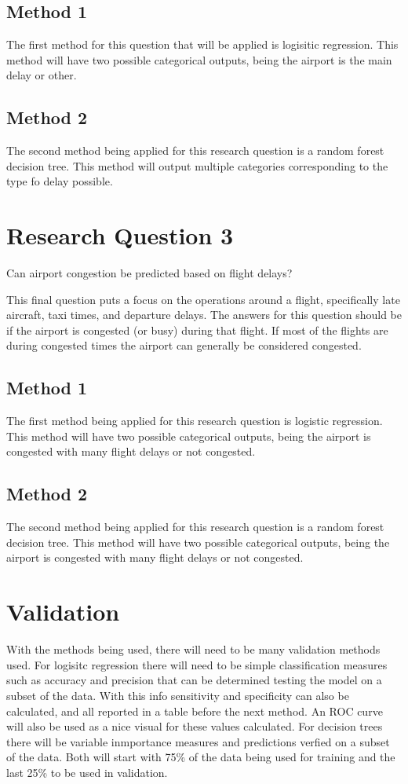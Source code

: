 \documentclass[a4paper,12pt]{article}
\begin{document}
\subsection{Method 1}
The first method for this question that will be applied is logisitic regression. This method will have two possible categorical outputs, being the airport is the main delay
or other.

\subsection{Method 2}
The second method being applied for this research question is a random forest decision tree. This method will output multiple categories corresponding to the type fo delay possible.


\section{Research Question 3}
Can airport congestion be predicted based on flight delays?

This final question puts a focus on the operations around a flight, specifically late aircraft, taxi times, and departure delays. The answers for this question should be if the airport is 
congested (or busy) during that flight. If most of the flights are during congested times the airport can generally be considered congested.

\subsection{Method 1}
The first method being applied for this research question is logistic regression. This method will have two possible categorical outputs, being the airport is congested with many flight delays
or not congested.

\subsection{Method 2}
The second method being applied for this research question is a random forest decision tree. This method will have two possible categorical outputs, being the airport is congested with many flight delays
or not congested.

\section{Validation}
With the methods being used, there will need to be many validation methods used. For logisitc regression there will need to be simple classification measures such as accuracy and precision that can be determined
testing the model on a subset of the data. With this info sensitivity and specificity can also be calculated, and all reported in a table before the next method. An ROC curve will also be used as a nice visual for these values calculated.
For decision trees there will be variable inmportance measures and predictions verfied on a subset of the data. Both will start with 75\% of the data being used for training and the last 25\% to be used in validation.
\end{document}
